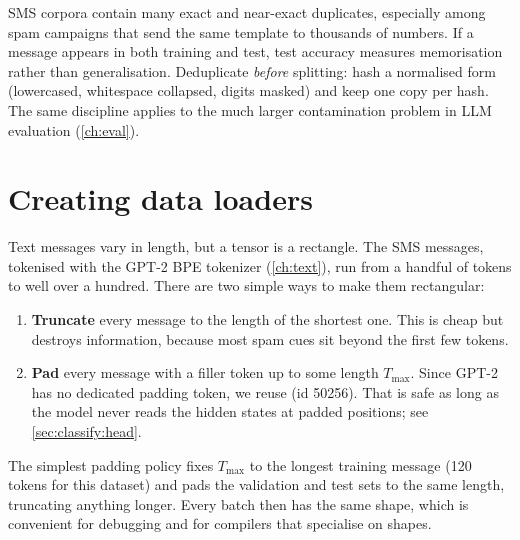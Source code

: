 \begin{pitfall}
SMS corpora contain many exact and near-exact duplicates, especially among spam
campaigns that send the same template to thousands of numbers. If a message appears in
both training and test, test accuracy measures memorisation rather than generalisation.
Deduplicate \emph{before} splitting: hash a normalised form (lowercased, whitespace
collapsed, digits masked) and keep one copy per hash. The same discipline applies to the
much larger contamination problem in LLM evaluation (\cref{ch:eval}).
\end{pitfall}

\section{Creating data loaders}\label{sec:classify:loaders}

Text messages vary in length, but a tensor is a rectangle. The SMS messages, tokenised
with the GPT-2 BPE tokenizer (\cref{ch:text}), run from a handful of tokens to well over
a hundred. There are two simple ways to make them rectangular:

\begin{enumerate}
\item \textbf{Truncate} every message to the length of the shortest one. This is cheap
but destroys information, because most spam cues sit beyond the first few tokens.
\item \textbf{Pad} every message with a filler token up to some length $T_{\max}$. Since
GPT-2 has no dedicated padding token, we reuse  (id 50256). That is
safe as long as the model never reads the hidden states at padded positions; see
\cref{sec:classify:head}.
\end{enumerate}

The simplest padding policy fixes $T_{\max}$ to the
longest training message (120 tokens for this dataset) and pads the validation and test
sets to the same length, truncating anything longer. Every batch then has the same
shape, which is convenient for debugging and for compilers that specialise on shapes.

